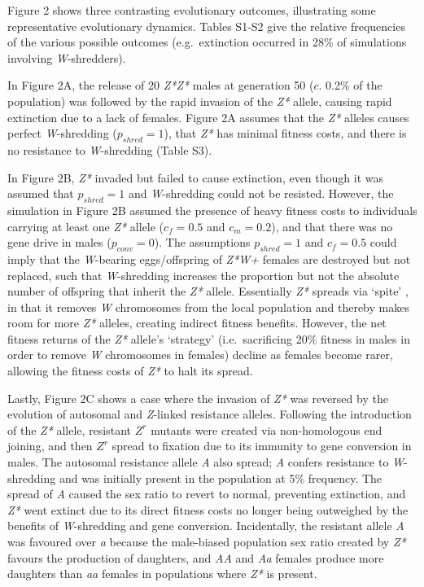 \documentclass[]{rsos}%
\begin{document}
Figure 2 shows three contrasting evolutionary outcomes, illustrating
some representative evolutionary dynamics. Tables S1-S2 give the
relative frequencies of the various possible outcomes (e.g.~extinction
occurred in 28\% of simulations involving \emph{W}-shredders).

In Figure 2A, the release of 20 \emph{Z*Z*} males at generation 50
(\(c\). 0.2\% of the population) was followed by the rapid invasion of
the \emph{Z*} allele, causing rapid extinction due to a lack of females.
Figure 2A assumes that the \emph{Z*} alleles causes perfect
\emph{W}-shredding (\(p_{shred} = 1\)), that \emph{Z*} has minimal
fitness costs, and there is no resistance to \emph{W}-shredding (Table
S3).

In Figure 2B, \emph{Z*} invaded but failed to cause extinction, even
though it was assumed that \(p_{shred} = 1\) and \emph{W}-shredding
could not be resisted. However, the simulation in Figure 2B assumed the
presence of heavy fitness costs to individuals carrying at least one
\emph{Z*} allele (\(c_f = 0.5\) and \(c_m = 0.2\)), and that there was
no gene drive in males (\(p_{conv} = 0\)). The assumptions
\(p_{shred} = 1\) and \(c_f = 0.5\) could imply that the
\emph{W}-bearing eggs/offspring of \emph{Z*W+} females are destroyed but
not replaced, such that \emph{W}-shredding increases the proportion but
not the absolute number of offspring that inherit the \emph{Z*} allele.
Essentially \emph{Z*} spreads via `spite' \citep{gardner2006sp}, in that
it removes \emph{W} chromosomes from the local population and thereby
makes room for more \emph{Z*} alleles, creating indirect fitness
benefits. However, the net fitness returns of the \emph{Z*} allele's
`strategy' (i.e.~sacrificing 20\% fitness in males in order to remove
\emph{W} chromosomes in females) decline as females become rarer,
allowing the fitness costs of \emph{Z*} to halt its spread.

Lastly, Figure 2C shows a case where the invasion of \emph{Z*} was
reversed by the evolution of autosomal and \emph{Z}-linked resistance
alleles. Following the introduction of the \emph{Z*} allele, resistant
\(Z^r\) mutants were created via non-homologous end joining, and then
\(Z^r\) spread to fixation due to its immunity to gene conversion in
males. The autosomal resistance allele \emph{A} also spread; \emph{A}
confers resistance to \emph{W}-shredding and was initially present in
the population at 5\% frequency. The spread of \emph{A} caused the sex
ratio to revert to normal, preventing extinction, and \emph{Z*} went
extinct due to its direct fitness costs no longer being outweighed by
the benefits of \emph{W}-shredding and gene conversion. Incidentally,
the resistant allele \emph{A} was favoured over \emph{a} because the
male-biased population sex ratio created by \emph{Z*} favours the
production of daughters, and \emph{AA} and \emph{Aa} females produce
more daughters than \emph{aa} females in populations where \emph{Z*} is
present.
\end{document}
